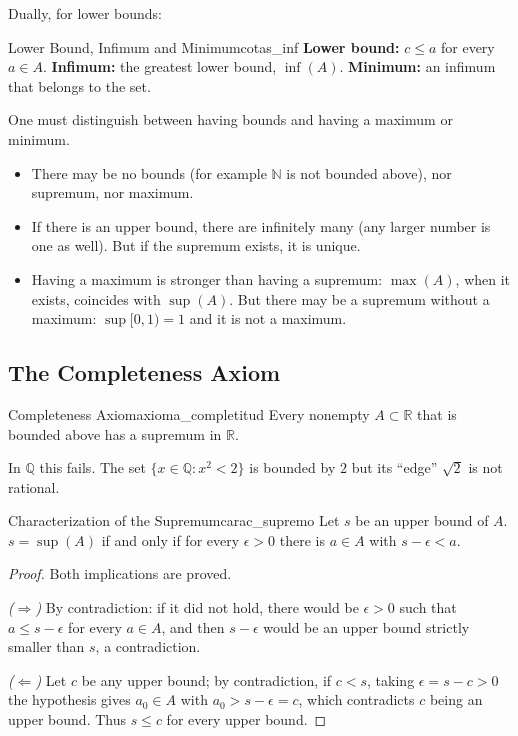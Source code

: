 \documentclass[11pt, a4paper]{article}
\begin{document}
Dually, for lower bounds:

\begin{definicion}{Lower Bound, Infimum and Minimum}{cotas_inf}
\textbf{Lower bound:} $c \le a$ for every $a \in A$. \textbf{Infimum:} the greatest lower bound,
$\inf(A)$. \textbf{Minimum:} an infimum that belongs to the set.
\end{definicion}

\obs One must distinguish between having bounds and having a maximum or minimum.
\begin{itemize}
    \item There may be no bounds (for example $\mathbb{N}$ is not bounded above), nor supremum, nor
    maximum.
    \item If there is an upper bound, there are infinitely many (any larger number is one as well). But if
    the supremum exists, it is unique.
    \item Having a maximum is stronger than having a supremum: $\max(A)$, when it exists, coincides with
    $\sup(A)$. But there may be a supremum without a maximum: $\sup [0,1) = 1$ and it is not a maximum.
\end{itemize}

\subsection{The Completeness Axiom}

\begin{teorema}{Completeness Axiom}{axioma_completitud}
Every nonempty $A \subset \mathbb{R}$ that is bounded above has a supremum in $\mathbb{R}$.
\end{teorema}

\obs In $\mathbb{Q}$ this fails. The set $\{x \in \mathbb{Q} : x^2 < 2\}$ is bounded by $2$
but its ``edge'' $\sqrt{2}$ is not rational.

\begin{proposicion}{Characterization of the Supremum}{carac_supremo}
Let $s$ be an upper bound of $A$. $s = \sup(A)$ if and only if for every $\epsilon > 0$ there is $a \in A$
with $s - \epsilon < a$.
\end{proposicion}

\begin{proof}
Both implications are proved.

\textit{($\Rightarrow$)} By contradiction: if it did not hold, there would be $\epsilon > 0$ such that
$a \le s - \epsilon$ for every $a \in A$, and then $s - \epsilon$ would be an upper bound
strictly smaller than $s$, a contradiction.

\textit{($\Leftarrow$)} Let $c$ be any upper bound; by contradiction, if $c < s$, taking
$\epsilon = s - c > 0$ the
hypothesis gives $a_0 \in A$ with $a_0 > s - \epsilon = c$, which contradicts $c$ being an upper
bound. Thus $s \le c$ for every upper bound.
\end{proof}
\end{document}

